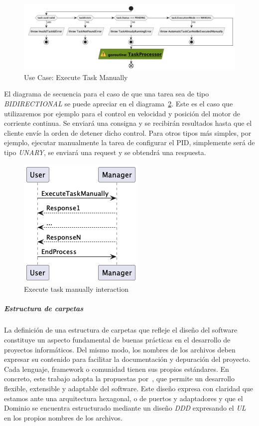 \begin{figure}[H]
    \centering
    \includegraphics[height=0.2\textheight]{./part/Proyecto_ejecutivo/memoria_descriptiva/descripcionDelProyecto/manager/uml/1-executeTaskManual}
    \caption{Use Case: Execute Task Manually}\label{fig:Use Case-Execute Task Manually}
\end{figure}

El diagrama de secuencia para el caso de que una tarea sea de tipo \textit{BIDIRECTIONAL} se puede apreciar en el diagrama~\cref{fig:executeTaskManualInteraction}. Este es el caso que utilizaremos por ejemplo para el control en velocidad y posición del motor de corriente continua. Se enviará una consigna y se recibirán resultados hasta que el cliente envíe la orden de detener dicho control. Para otros tipos más simples, por ejemplo, ejecutar manualmente la tarea de configurar el PID, simplemente será de tipo \textit{UNARY}, se enviará una request y se obtendrá una respuesta.

\begin{figure}[H]
    \centering
    \includegraphics[height=0.2\textheight]{./part/Proyecto_ejecutivo/memoria_descriptiva/descripcionDelProyecto/manager/uml/1-ExecuteTaskManuallyInteraction}
    \caption{Execute task manually interaction}\label{fig:executeTaskManualInteraction}
\end{figure}

\subparagraph{Estructura de carpetas}

La definición de una estructura de carpetas que refleje el diseño del software constituye un aspecto fundamental de buenas prácticas en el desarrollo de proyectos informáticos. Del mismo modo, los nombres de los archivos deben expresar su contenido para facilitar la documentación y depuración del proyecto. Cada lenguaje, framework o comunidad tienen sus propios estándares. En concreto, este trabajo adopta la propuestas por~\cite{TomHombergs2019GYHD}, que permite un desarrollo flexible, extensible y adaptable del software. Este diseño expresa con claridad que estamos ante una arquitectura hexagonal, o de puertos y adaptadores y que el Dominio se encuentra estructurado mediante un diseño \textit{DDD} expresando el \textit{UL} en los propios nombres de los archivos.

